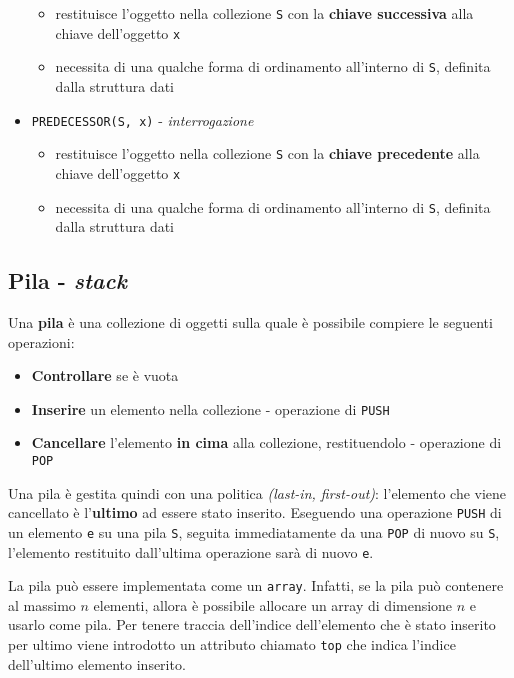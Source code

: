 \documentclass[italian, 10pt]{article}
\begin{document}
\begin{itemize}
        \begin{itemize}
          \item restituisce l'oggetto nella collezione \texttt{S} con la \textbf{chiave successiva} alla chiave dell'oggetto \texttt{x}
          \item necessita di una qualche forma di ordinamento all'interno di \texttt{S}, definita dalla struttura dati
        \end{itemize}
  \item \texttt{PREDECESSOR(S, x)} - \textit{interrogazione}
        \begin{itemize}
          \item restituisce l'oggetto nella collezione \texttt{S} con la \textbf{chiave precedente} alla chiave dell'oggetto \texttt{x}
          \item necessita di una qualche forma di ordinamento all'interno di \texttt{S}, definita dalla struttura dati
        \end{itemize}
\end{itemize}

\subsection{Pila - \textit{stack}}

Una \textbf{pila} è una collezione di oggetti sulla quale è possibile compiere le seguenti operazioni:

\begin{itemize}
  \item \textbf{Controllare} se è vuota
  \item \textbf{Inserire} un elemento nella collezione - operazione di \texttt{PUSH}
  \item \textbf{Cancellare} l'elemento \textbf{in cima} alla collezione, restituendolo - operazione di \texttt{POP}
\end{itemize}

Una pila è gestita quindi con una politica \LIFO \textit{(last-in, first-out)}: l'elemento che viene cancellato è l'\textbf{ultimo} ad essere stato inserito.
Eseguendo una operazione \texttt{PUSH} di un elemento \texttt{e} su una pila \texttt{S}, seguita immediatamente da una \texttt{POP} di nuovo su \texttt{S}, l'elemento restituito dall'ultima operazione sarà di nuovo \texttt{e}.

\bigskip
La pila può essere implementata come un \texttt{array}.
Infatti, se la pila può contenere al massimo \(n\) elementi, allora è possibile allocare un array di dimensione \(n\) e usarlo come pila.
Per tenere traccia dell'indice dell'elemento che è stato inserito per ultimo viene introdotto un attributo chiamato \texttt{top} che indica l'indice dell'ultimo elemento inserito.
\end{document}
